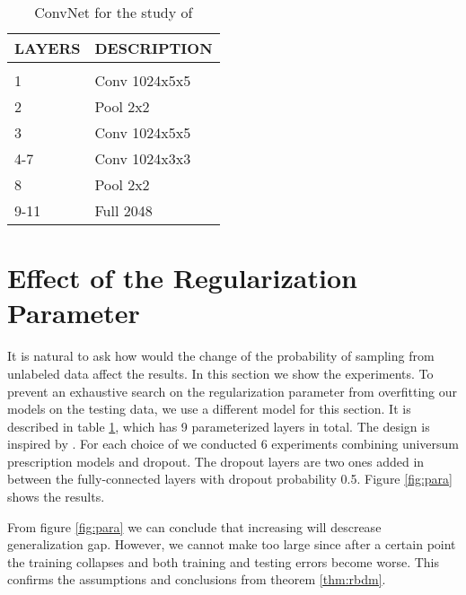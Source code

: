 \documentclass[letterpaper]{article}
\begin{document}
\begin{table}[h]
  \caption{ConvNet for the study of }
  \label{tab:para}
  \begin{center}
    \begin{tabular}{ll}
      \multicolumn{1}{c}{\bf LAYERS}  &\multicolumn{1}{c}{\bf DESCRIPTION}
      \\ \hline \\
      1             &Conv 1024x5x5 \\
      2             &Pool 2x2 \\
      3             &Conv 1024x5x5 \\
      4-7           &Conv 1024x3x3 \\
      8             &Pool 2x2 \\
      9-11          &Full 2048 \\
    \end{tabular}
  \end{center}
\end{table}

\section{Effect of the Regularization Parameter}
\label{sec:para}

It is natural to ask how would the change of the probability  of sampling from unlabeled data affect the results. In this section we show the experiments. To prevent an exhaustive search on the regularization parameter from overfitting our models on the testing data, we use a different model for this section. It is described in table \ref{tab:para}, which has 9 parameterized layers in total. The design is inspired by \cite{SEZMFL13}. For each choice of  we conducted 6 experiments combining universum prescription models and dropout. The dropout layers are two ones added in between the fully-connected layers with dropout probability 0.5. Figure \ref{fig:para} shows the results.

From figure \ref{fig:para} we can conclude that increasing  will descrease generalization gap. However, we cannot make  too large since after a certain point the training collapses and both training and testing errors become worse. This confirms the assumptions and conclusions from theorem \ref{thm:rbdm}.
\end{document}
